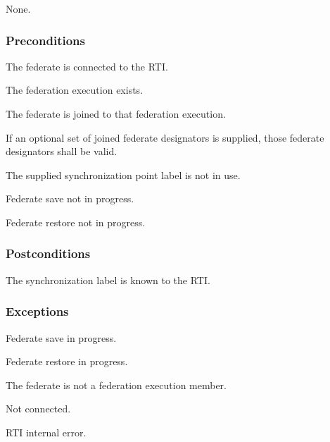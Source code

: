 \begin{stdalphalist}
    \item None.
\end{stdalphalist}

\subsubsection{Preconditions}

\begin{stdalphalist}
    \item The federate is connected to the RTI.
    \item The federation execution exists.
    \item The federate is joined to that federation execution.
    \item If an optional set of joined federate designators is supplied, those federate designators shall be valid.
    \item The supplied synchronization point label is not in use.
    \item Federate save not in progress.
    \item Federate restore not in progress.
\end{stdalphalist}

\subsubsection{Postconditions}

\begin{stdalphalist}
    \item The synchronization label is known to the RTI.
\end{stdalphalist}

\subsubsection{Exceptions}

\begin{stdalphalist}
    \item Federate save in progress.
    \item Federate restore in progress.
\end{stdalphalist}

\clearpage

\begin{stdalphalist}
    \setcounter{enumi}{2}
    \item The federate is not a federation execution member.
    \item Not connected.
    \item RTI internal error.
\end{stdalphalist}

